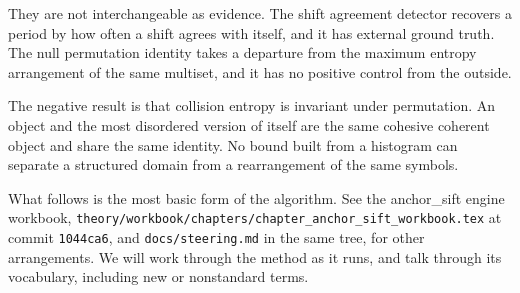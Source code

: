 They are not interchangeable as evidence. The shift agreement detector recovers a period by how
often a shift agrees with itself, and it has external ground truth. The null permutation identity
takes a departure from the maximum entropy arrangement of the same multiset, and it has no positive
control from the outside.

The negative result is that collision entropy is invariant under permutation. An object and the
most disordered version of itself are the same cohesive coherent object and share the same
identity. No bound built from a histogram can separate a structured domain from a rearrangement of
the same symbols.

What follows is the most basic form of the algorithm. See the anchor\_sift engine workbook,
\texttt{theory/\allowbreak{}workbook/\allowbreak{}chapters/\allowbreak{}chapter\_\allowbreak{}anchor\_\allowbreak{}sift\_\allowbreak{}workbook.\allowbreak{}tex}
at commit \texttt{1044ca6}, and \texttt{docs/\allowbreak{}steering.md} in the same tree, for other
arrangements. We will work through the method as it runs, and talk through its
vocabulary, including new or nonstandard terms.
\cleardoublepage
